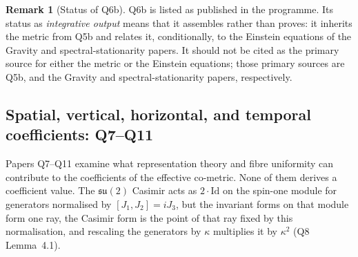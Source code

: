 \documentclass[11pt,a4paper]{article}
\theoremstyle{definition}
\newtheorem{remark}{Remark}
\newcommand{\su}{\mathfrak{su}}
\begin{document}
      \begin{remark}[Status of Q6b]
Q6b is listed as published in the programme.
Its status as \emph{integrative output} means that it assembles rather than proves: it
inherits the metric from Q5b and relates it, conditionally, to the Einstein equations of the Gravity and
spectral-stationarity papers.
It should not be cited as the primary source for either the metric or the Einstein
equations; those primary sources are Q5b, and the Gravity and spectral-stationarity papers, respectively.
      \end{remark}

    \subsection{Spatial, vertical, horizontal, and temporal coefficients: Q7--Q11}
      \label{sec:q7q11}

      Papers Q7--Q11 examine what representation theory and fibre uniformity can contribute to
      the coefficients of the effective co-metric.
      None of them derives a coefficient value.
      The $\su(2)$ Casimir acts as $2 \cdot \mathrm{Id}$ on the spin-one module for generators
      normalised by $[J_1, J_2] = iJ_3$, but the invariant forms on that module form one ray,
      the Casimir form is the point of that ray fixed by this normalisation, and rescaling the
      generators by $\kappa$ multiplies it by $\kappa^2$ (Q8 Lemma~4.1).
\end{document}
